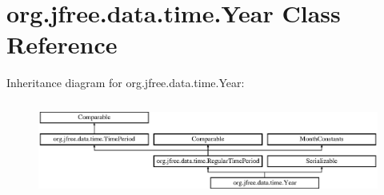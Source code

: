 \hypertarget{classorg_1_1jfree_1_1data_1_1time_1_1_year}{}\section{org.\+jfree.\+data.\+time.\+Year Class Reference}
\label{classorg_1_1jfree_1_1data_1_1time_1_1_year}
Inheritance diagram for org.\+jfree.\+data.\+time.\+Year\+:\begin{figure}[H]
\begin{center}
\leavevmode
\includegraphics[height=3.190883cm]{classorg_1_1jfree_1_1data_1_1time_1_1_year}
\end{center}
\end{figure}
